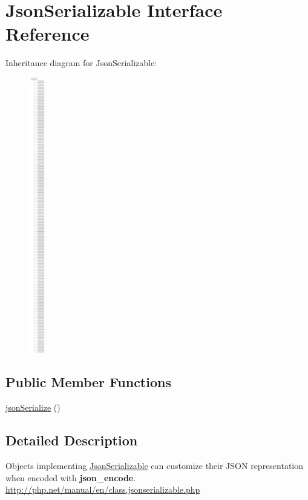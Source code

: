 \hypertarget{interfaceJsonSerializable}{}\section{Json\+Serializable Interface Reference}
\label{interfaceJsonSerializable}
Inheritance diagram for Json\+Serializable\+:\begin{figure}[H]
\begin{center}
\leavevmode
\includegraphics[height=12.000000cm]{interfaceJsonSerializable}
\end{center}
\end{figure}
\subsection*{Public Member Functions}
\begin{DoxyCompactItemize}
\item 
\hyperlink{interfaceJsonSerializable_a1ea2f3379f3e0c28ac0e2ce8256ec6ec}{json\+Serialize} ()
\end{DoxyCompactItemize}


\subsection{Detailed Description}
Objects implementing \hyperlink{interfaceJsonSerializable}{Json\+Serializable} can customize their J\+S\+O\+N representation when encoded with {\bfseries json\+\_\+encode}. \hyperlink{}{http\+://php.\+net/manual/en/class.\+jsonserializable.\+php}

